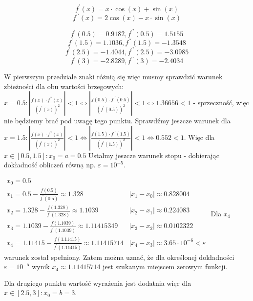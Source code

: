 \documentclass[5]{article}
\begin{document}
$$f^{\prime}(x)=x \cdot \cos (x)+\sin (x)$$
$$f^{\prime \prime}(x)=2 \cos (x)-x \cdot \sin (x)$$

\vspace{3mm}
$$f^{\prime}(0.5)=0.9182, f^{\prime \prime}(0.5)=1.5155$$
$$f^{\prime}(1.5)=1.1036, f^{\prime \prime}(1.5)=-1.3548 $$
\vspace{3mm}
$$f^{\prime}(2.5)=-1.4044, f^{\prime \prime}(2.5)=-3.0985$$
$$f^{\prime}(3)=-2.8289, f^{\prime \prime}(3)=-2.4034$$

\vspace{4mm}
W pierwszym przedziale znaki różnią się więc musmy sprawdzić warunek zbieżności dla obu wartości brzegowych: $x=0.5:\left|\frac{f(x) \cdot f^{\prime \prime}(x)}{\left(f^{\prime}(x)\right)^{2}}\right|<1 \Leftrightarrow\left|\frac{f(0.5) \cdot f^{\prime \prime}(0.5)}{\left(f^{\prime}(0.5)\right)^{2}}\right|<1 \Leftrightarrow 1.36656<1$ - sprzeczność, więc nie będziemy brać pod uwagę tego punktu. Sprawdźmy jeszcze warunek dla $x=1.5:\left|\frac{f(x) \cdot f^{\prime \prime}(x)}{\left(f^{\prime}(x)\right)^{2}}\right|<1 \Leftrightarrow\left|\frac{f(1.5) \cdot f^{\prime \prime}(1.5)}{\left(f^{\prime}(1.5)\right)^{2}}\right|<1 \Leftrightarrow 0.552<1$. Więc dla $x \in[0.5, 1.5]: x_{0}=a=0.5$
Ustalmy jeszcze warunek stopu - dobierając dokładność obliczeń równạ np. $\varepsilon=10^{-5}$.
\newline



$
\begin{array}{ll}
x_{0}=0.5 \\
x_{1}=0.5-\frac{f(0.5)}{f^{\prime}(0.5)} \approx 1.328 &
\left|x_{1}-x_{0}\right| \approx 0.828004 \\
x_{2}=1.328-\frac{f(1.328)}{f^{\prime}(1.328)} \approx 1.1039 &
\left|x_{2}-x_{1}\right| \approx 0.224083 \\
x_{3}=1.1039-\frac{f(1.1039)}{f^{\prime}(1.1039)} \approx 1.11415349 &
\left|x_{3}-x_{2}\right| \approx 0.0102322 \\
x_{4}=1.11415-\frac{f(1.11415)}{f^{\prime}(1.11415)} \approx 1.11415714 &
\left|x_{4}-x_{3}\right| \approx 3.65 \cdot 10^{-6}<\varepsilon
\end{array}
$
\vspace{3mm}
\newline
Dla $x_{4}$ warunek został spełniony. Zatem można uznać, że dla określonej dokładności $\varepsilon=10^{-5}$ wynik $x_{4} \approx 1.11415714$ jest szukanym miejscem zerowym funkcji.

\vspace{7mm}
Dla drugiego punktu wartość wyrażenia jest dodatnia więc dla $x \in[2.5, 3]: x_{0}=b=3$.
\end{document}
